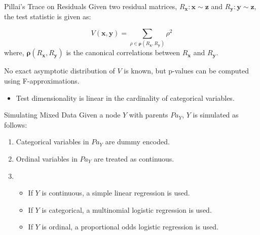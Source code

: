 \documentclass{beamer}
\begin{document}
\begin{frame}{Pillai's Trace on Residuals}
Given two residual matrices, $ R_{\mathbf{x}}: \mathbf{x} \sim \mathbf{z} $ and $ R_{\mathbf{y}}: \mathbf{y} \sim \mathbf{z} $, the test statistic is given as:

\begin{equation}
	\textit{V}(\mathbf{x}, \mathbf{y}) = \sum_{\rho \in \bm{\rho}(R_\mathbf{x}, R_\mathbf{y})} \rho^2
\end{equation}
where, $ \bm{\rho}({R_\mathbf{x}, R_\mathbf{y}}) $  is the canonical correlations between $ R_\mathbf{x} $ and $ R_\mathbf{y} $.

\vspace{1em}

No exact asymptotic distribution of $ V $ is known, but p-values can be computed using F-approximations. \footnotemark

\vspace{1em}

\begin{itemize}
	\item Test dimensionality is linear in the cardinality of categorical variables.
\end{itemize}

\end{frame}

\begin{frame}{Simulating Mixed Data}
	Given a node $ Y $ with parents $ Pa_Y $, $ Y $ is simulated as follows:
	\begin{enumerate}
		\item Categorical variables in $ Pa_Y $ are dummy encoded.
		\item Ordinal variables in $Pa_Y$ are treated as continuous.
		\item \begin{itemize}
			\item If $ Y $ is continuous, a simple linear regression is used.
			\item If $ Y $ is categorical, a multinomial logistic regression is used.
			\item If $ Y $ is ordinal, a proportional odds logistic regression is used.
		\end{itemize}
	\end{enumerate}
\end{frame}
\end{document}
